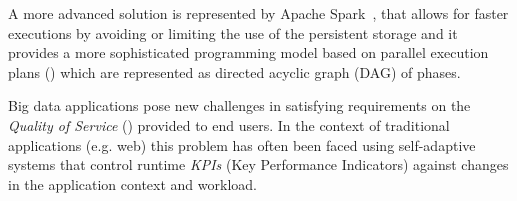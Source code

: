 A more advanced solution is represented by Apache Spark~\cite{misc:ApacheSpark}, that allows for faster executions by avoiding or limiting the use of the persistent storage and it provides a more sophisticated programming model based on parallel execution plans (\plans) which are represented as directed acyclic graph (DAG) of phases.

Big data applications pose new challenges in satisfying requirements on the \textit{Quality of Service} (\qos) provided to end users. In the context of traditional applications (e.g. web) this problem has often been faced using self-adaptive systems that control runtime \textit{KPIs} (Key Performance Indicators) against changes in the application context and workload. %

